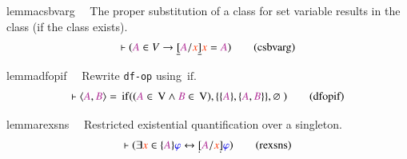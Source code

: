 \begin{restatable}{lemma}{csbvarg}~~ The proper substitution of a class for
set variable results in the
       class (if the class exists).  ~
\begin{align}
\vdash ( \mc{A} \in V \rightarrow \underline{[} \mc{A} / \msc{x} \underline{]}
    \msc{x} = \mc{A} )\label{eq:csbvarg}\tag{csbvarg}
\end{align}
\end{restatable}

\dfop

\begin{restatable}{lemma}{dfopif}~~ Rewrite {\tt df-op} using $\,\mathrm{if}$. 
\begin{align}
\vdash \langle \mc{A} , \mc{B} \rangle = \,\mathrm{if} ( ( \mc{A} \in
    \,\mathrm{V} \wedge \mc{B} \in \,\mathrm{V} ) , \{ \{ \mc{A} \} , \{ \mc{A}
    , \mc{B} \} \} , \varnothing~ )\label{eq:dfopif}\tag{dfopif}
\end{align}
\end{restatable}

\dfot

\begin{restatable}{lemma}{rexsns}~~ Restricted existential quantification over a
singleton.  ~  ~
\begin{align}
\vdash ( \exists \msc{x} \in \{ \mc{A} \} \mw{\varphi} \leftrightarrow
    \underaccent{\dot}{[} \mc{A} / \msc{x} \underaccent{\dot}{]} \mw{\varphi}
    )\label{eq:rexsns}\tag{rexsns}
\end{align}
\end{restatable}

